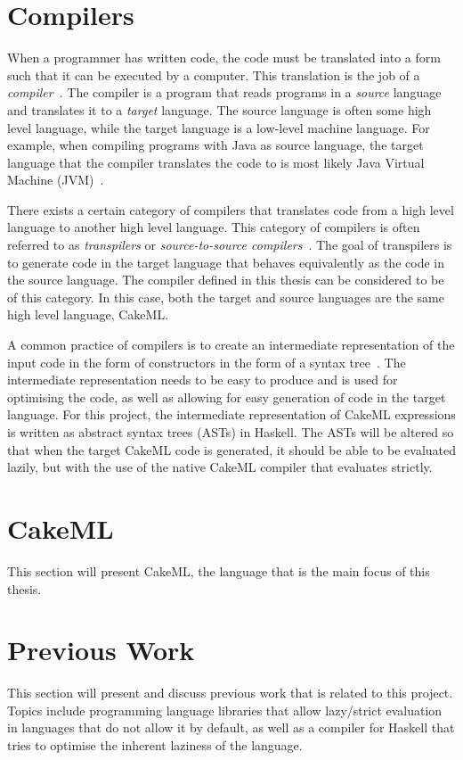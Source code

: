 \section{Compilers}
When a programmer has written code, the code must be translated into a form such
that it can be executed by a computer. This translation is the job of a
\textit{compiler}~\cite{DragonBook}. The compiler is a program that reads
programs in a \textit{source} language and translates it to a \textit{target}
language. The source language is often some high level language, while the
target language is a low-level machine language.
For example, when compiling programs with Java as source language, the target
language that the compiler translates the code to is most likely Java Virtual
Machine (JVM)~\cite{JavaJVM}.

There exists a certain category of compilers that translates code from a
high level language to another high level language. This category of compilers
is often referred to as \textit{transpilers} or
\textit{source-to-source compilers}~\cite{kulkarnitranspiler}.
The goal of transpilers is to generate code in the target language that behaves
equivalently as the code in the source language. The compiler defined in this %
thesis can be considered to be of this category. In this case, both the target
and source languages are the same high level language, CakeML.

A common practice of compilers is to create an intermediate representation of
the input code in the form of constructors in the form of a syntax
tree~\cite{DragonBook}. The intermediate representation needs to be
easy to produce and is used for optimising the code, as well as allowing for
easy generation of code in the target language.
For this project, the intermediate representation of CakeML expressions is %
written as abstract syntax trees (ASTs) in Haskell. The ASTs will be altered so
that when the target CakeML code is generated, it should be able to be evaluated
lazily, but with the use of the native CakeML compiler that evaluates strictly.

\section{CakeML}
\label{back:cakeml}
This section will present CakeML, the language that is the main focus of this
thesis.

\section{Previous Work}
This section will present and discuss previous work that is related to this
project. Topics include programming language libraries that allow lazy/strict
evaluation in languages that do not allow it by default, as well as a compiler
for Haskell that tries to optimise the inherent laziness of the language.

